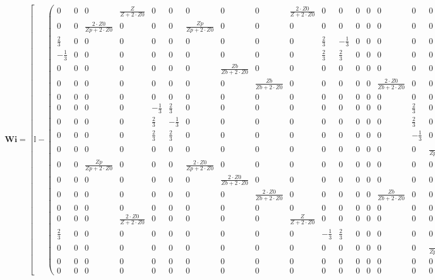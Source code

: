 \[ \mathbf{Wi} =  \left[ \mathbb{I}  -
\left(\begin{array}{cccccccccccccccccccc} 0 & 0 & 0 &
\frac{Z}{Z+2\cdot Z0} & 0 & 0 & 0 & 0 & 0 & \frac{2\cdot Z0}{Z+2\cdot
Z0} & 0 & 0 & 0 & 0 & 0 & 0 & 0 & 0 & 0 & 0 \\ 0 & 0 & \frac{2\cdot
Z0}{Zp+2\cdot Z0} & 0 & 0 & 0 & \frac{Zp}{Zp+2\cdot Z0} & 0 & 0 & 0 &
0 & 0 & 0 & 0 & 0 & 0 & 0 & 0 & 0 & 0 \\ \frac{2}{3} & 0 & 0 & 0 & 0 &
0 & 0 & 0 & 0 & 0 & \frac{2}{3} & -\frac{1}{3} & 0 & 0 & 0 & 0 & 0 & 0
& 0 & 0 \\ -\frac{1}{3} & 0 & 0 & 0 & 0 & 0 & 0 & 0 & 0 & 0 &
\frac{2}{3} & \frac{2}{3} & 0 & 0 & 0 & 0 & 0 & 0 & 0 & 0 \\ 0 & 0 & 0
& 0 & 0 & 0 & 0 & \frac{Zb}{Zb+2\cdot Z0} & 0 & 0 & 0 & 0 & 0 & 0 & 0
& 0 & 0 & 0 & 0 & \frac{2\cdot Z0}{Zb+2\cdot Z0} \\ 0 & 0 & 0 & 0 & 0
& 0 & 0 & 0 & \frac{Zb}{Zb+2\cdot Z0} & 0 & 0 & 0 & 0 & 0 &
\frac{2\cdot Z0}{Zb+2\cdot Z0} & 0 & 0 & 0 & 0 & 0 \\ 0 & 0 & 0 & 0 &
0 & 0 & 0 & 0 & 0 & 0 & 0 & 0 & 0 & 0 & 0 & 0 & 0 & 0 & 0 & 0 \\ 0 & 0
& 0 & 0 & -\frac{1}{3} & \frac{2}{3} & 0 & 0 & 0 & 0 & 0 & 0 & 0 & 0 &
0 & \frac{2}{3} & 0 & 0 & 0 & 0 \\ 0 & 0 & 0 & 0 & \frac{2}{3} &
-\frac{1}{3} & 0 & 0 & 0 & 0 & 0 & 0 & 0 & 0 & 0 & \frac{2}{3} & 0 & 0
& 0 & 0 \\ 0 & 0 & 0 & 0 & \frac{2}{3} & \frac{2}{3} & 0 & 0 & 0 & 0 &
0 & 0 & 0 & 0 & 0 & -\frac{1}{3} & 0 & 0 & 0 & 0 \\ 0 & 0 & 0 & 0 & 0
& 0 & 0 & 0 & 0 & 0 & 0 & 0 & 0 & 0 & 0 & 0 & \frac{Zp}{Zp+2\cdot Z0}
& 0 & \frac{2\cdot Z0}{Zp+2\cdot Z0} & 0 \\ 0 & 0 &
\frac{Zp}{Zp+2\cdot Z0} & 0 & 0 & 0 & \frac{2\cdot Z0}{Zp+2\cdot Z0} &
0 & 0 & 0 & 0 & 0 & 0 & 0 & 0 & 0 & 0 & 0 & 0 & 0 \\ 0 & 0 & 0 & 0 & 0
& 0 & 0 & \frac{2\cdot Z0}{Zb+2\cdot Z0} & 0 & 0 & 0 & 0 & 0 & 0 & 0 &
0 & 0 & 0 & 0 & \frac{Zb}{Zb+2\cdot Z0} \\ 0 & 0 & 0 & 0 & 0 & 0 & 0 &
0 & \frac{2\cdot Z0}{Zb+2\cdot Z0} & 0 & 0 & 0 & 0 & 0 &
\frac{Zb}{Zb+2\cdot Z0} & 0 & 0 & 0 & 0 & 0 \\ 0 & 0 & 0 & 0 & 0 & 0 &
0 & 0 & 0 & 0 & 0 & 0 & 0 & 0 & 0 & 0 & 0 & 0 & 0 & 0 \\ 0 & 0 & 0 &
\frac{2\cdot Z0}{Z+2\cdot Z0} & 0 & 0 & 0 & 0 & 0 & \frac{Z}{Z+2\cdot
Z0} & 0 & 0 & 0 & 0 & 0 & 0 & 0 & 0 & 0 & 0 \\ \frac{2}{3} & 0 & 0 & 0
& 0 & 0 & 0 & 0 & 0 & 0 & -\frac{1}{3} & \frac{2}{3} & 0 & 0 & 0 & 0 &
0 & 0 & 0 & 0 \\ 0 & 0 & 0 & 0 & 0 & 0 & 0 & 0 & 0 & 0 & 0 & 0 & 0 & 0
& 0 & 0 & \frac{2\cdot Z0}{Zp+2\cdot Z0} & 0 & \frac{Zp}{Zp+2\cdot Z0}
& 0 \\ 0 & 0 & 0 & 0 & 0 & 0 & 0 & 0 & 0 & 0 & 0 & 0 & 0 & 0 & 0 & 0 &
0 & 0 & 0 & 0 \\ 0 & 0 & 0 & 0 & 0 & 0 & 0 & 0 & 0 & 0 & 0 & 0 & 0 & 0
& 0 & 0 & 0 & 0 & 0 & 0 \end{array}\right) \right]^{-1}  \]
